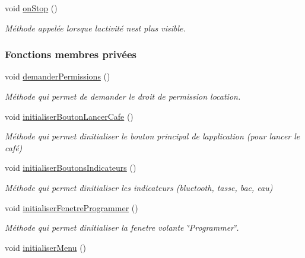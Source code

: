 \begin{DoxyCompactItemize}
void \hyperlink{classcom_1_1example_1_1ekawa_1_1_ihm_adc7bc6671d8cd5018724bcbf4fbc0d75}{on\+Stop} ()
\begin{DoxyCompactList}\small\item\em Méthode appelée lorsque l\textquotesingle{}activité n\textquotesingle{}est plus visible. \end{DoxyCompactList}\end{DoxyCompactItemize}
\subsubsection*{Fonctions membres privées}
\begin{DoxyCompactItemize}
\item 
void \hyperlink{classcom_1_1example_1_1ekawa_1_1_ihm_a30e0dc3bf57b1abc608cb8b932527566}{demander\+Permissions} ()
\begin{DoxyCompactList}\small\item\em Méthode qui permet de demander le droit de permission location. \end{DoxyCompactList}\item 
void \hyperlink{classcom_1_1example_1_1ekawa_1_1_ihm_a6616a5f240867f43c8e56f2b432e43be}{initialiser\+Bouton\+Lancer\+Cafe} ()
\begin{DoxyCompactList}\small\item\em Méthode qui permet d\textquotesingle{}initialiser le bouton principal de l\textquotesingle{}application (pour lancer le café) \end{DoxyCompactList}\item 
void \hyperlink{classcom_1_1example_1_1ekawa_1_1_ihm_ae38db41c355bc415b46f21f9d608d4b9}{initialiser\+Boutons\+Indicateurs} ()
\begin{DoxyCompactList}\small\item\em Méthode qui permet d\textquotesingle{}initialiser les indicateurs (bluetooth, tasse, bac, eau) \end{DoxyCompactList}\item 
void \hyperlink{classcom_1_1example_1_1ekawa_1_1_ihm_a08b1da8fdc68effff9a6da918e14d12d}{initialiser\+Fenetre\+Programmer} ()
\begin{DoxyCompactList}\small\item\em Méthode qui permet d\textquotesingle{}initialiser la fenetre volante \char`\"{}\+Programmer\char`\"{}. \end{DoxyCompactList}\item 
void \hyperlink{classcom_1_1example_1_1ekawa_1_1_ihm_a60968cecc69df879805b531a5f2ae19c}{initialiser\+Menu} ()

\end{DoxyCompactItemize}
